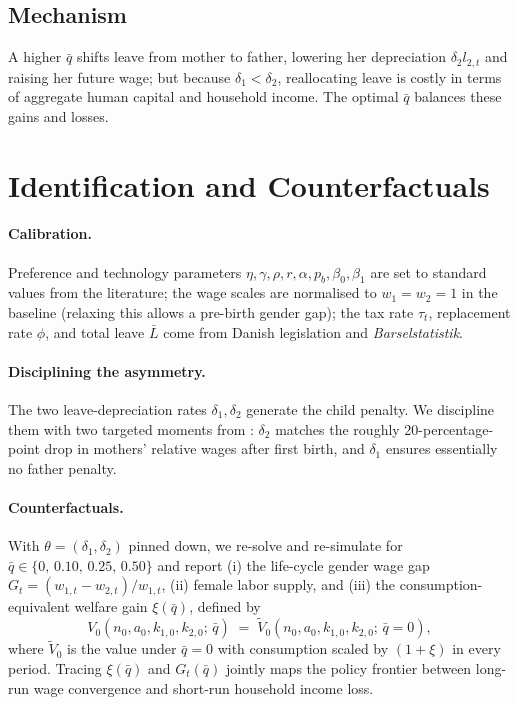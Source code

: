 \subsection*{Mechanism}

A higher $\bar{q}$ shifts leave from mother to father, lowering her depreciation $\delta_2 l_{2,t}$ and raising her future wage; but because $\delta_1 < \delta_2$, reallocating leave is costly in terms of aggregate human capital and household income. The optimal $\bar{q}$ balances these gains and losses.

\section*{Identification and Counterfactuals}

\paragraph{Calibration.} Preference and technology parameters $\eta, \gamma, \rho, r, \alpha, p_b, \beta_0, \beta_1$ are set to standard values from the literature; the wage scales are normalised to $w_1 = w_2 = 1$ in the baseline (relaxing this allows a pre-birth gender gap); the tax rate $\tau_t$, replacement rate $\phi$, and total leave $\bar{L}$ come from Danish legislation and \emph{Barselstatistik}.

\paragraph{Disciplining the asymmetry.} The two leave-depreciation rates $\delta_1, \delta_2$ generate the child penalty. We discipline them with two targeted moments from \citet{kleven2019children}: $\delta_2$ matches the roughly 20-percentage-point drop in mothers' relative wages after first birth, and $\delta_1$ ensures essentially no father penalty.

\paragraph{Counterfactuals.} With $\theta = (\delta_1, \delta_2)$ pinned down, we re-solve and re-simulate for $\bar{q} \in \{0,\, 0.10,\, 0.25,\, 0.50\}$ and report (i) the life-cycle gender wage gap $G_t = (w_{1,t}-w_{2,t})/w_{1,t}$, (ii) female labor supply, and (iii) the consumption-equivalent welfare gain $\xi(\bar{q})$, defined by
\begin{equation}
    V_0(n_0, a_0, k_{1,0}, k_{2,0};\, \bar{q}) \;=\; \tilde{V}_0(n_0, a_0, k_{1,0}, k_{2,0};\, \bar{q}=0),
\end{equation}
where $\tilde{V}_0$ is the value under $\bar{q}=0$ with consumption scaled by $(1+\xi)$ in every period. Tracing $\xi(\bar{q})$ and $G_t(\bar{q})$ jointly maps the policy frontier between long-run wage convergence and short-run household income loss.

